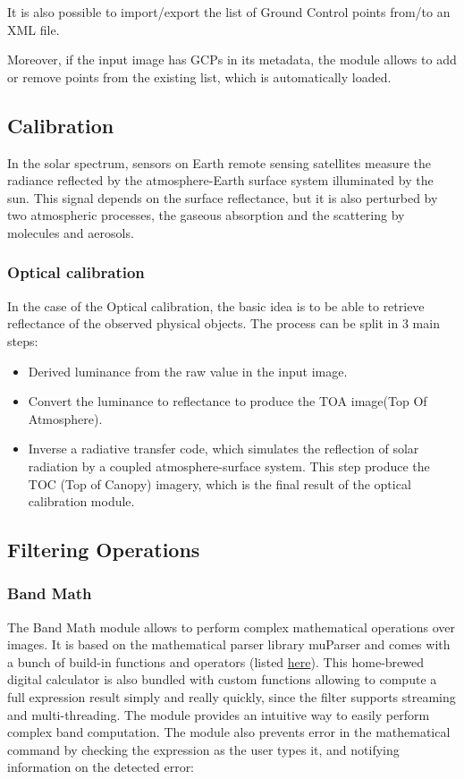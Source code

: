 It is also possible to import/export the list of Ground Control points
from/to an XML file.

Moreover, if the input image has GCPs in its metadata, the
module allows to add or remove points from the existing list, which is
automatically loaded.

\subsection{Calibration}
In the solar spectrum, sensors on Earth remote sensing satellites
measure the radiance reflected by the atmosphere-Earth surface system
illuminated by the sun. This signal depends on the surface
reflectance, but it is also perturbed by two atmospheric processes,
the gaseous absorption and the scattering by molecules and aerosols.

\subsubsection{Optical calibration}
In the case of the Optical calibration, the basic idea is to be able
to retrieve reflectance of the observed physical objects. The process can be split in 3 main steps:

\begin{itemize}
\item Derived luminance from the raw value in the input image. 
\item Convert the luminance to reflectance to produce the TOA
  image(Top Of Atmosphere).
\item Inverse a radiative transfer code, which simulates the reflection
  of solar radiation by a coupled atmosphere-surface system. This step
  produce the TOC (Top of Canopy) imagery, which is the final result of
  the optical calibration module.
\end{itemize}

\subsection{Filtering Operations}
\subsubsection{Band Math}
\label{Band_math module}
The Band Math module allows to perform complex mathematical operations
over images. It is based on the mathematical parser library muParser
and comes with a bunch of build-in functions and operators (listed
\href{http://muparser.sourceforge.net/mup_features.html#idDef2}{here}). This
home-brewed digital calculator is also bundled with custom functions
allowing to compute a full expression result simply and really quickly,
since the filter supports streaming and multi-threading.  The \mont
module provides an intuitive way to easily perform complex band computation. 
The module also prevents error in the mathematical
command by checking the expression as the user types it, and notifying
information on the detected error:

